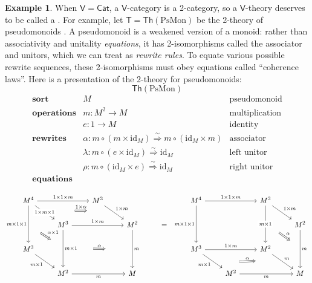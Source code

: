 \documentclass{amsart}
\newcommand{\define}[1]{{\bf \boldmath{#1}}}
\theoremstyle{definition}
\newtheorem{example}[theorem]{Example}
\newcommand{\Th}{\mathsf{Th}}
\newcommand{\Cat}{\mathsf{Cat}}
\newcommand{\V}{\mathsf{V}}
\newcommand{\T}{\mathsf{T}}
\newcommand{\maps}{\colon}
\newcommand{\id}{\mathrm{id}}
\begin{document}
\begin{example}
\label{ex:1}
When $\V = \Cat$, a $\V$-category is a 2-category, so a $\V$-theory deserves to be called a \define{2-theory}.  For example, let $\T = \Th(\mathrm{PsMon})$ be the 2-theory of pseudomonoids \cite{pseudo}.   A pseudomonoid is a weakened version of a monoid: rather than associativity and unitality \textit{equations}, it has 2-isomorphisms called the associator and unitors, which we can treat as \textit{rewrite rules}.  To equate various possible rewrite sequences, these 2-isomorphisms must obey equations called ``coherence laws''.  Here is a presentation of the 2-theory for pseudomonoids:
\newpage
	\[ \Th(\mathrm{PsMon}) \]
	\[\begin{array}{lll}
	\textbf{sort} & M & \text{pseudomonoid}\\
	 \textbf{operations}
	& m\maps M^2 \to M & \text{multiplication}\\
	 & e\maps1 \to M & \text{identity}\\
	\textbf{rewrites} & \alpha \colon m \circ (m \times \id_M) \stackrel{\sim}{\Longrightarrow} m \circ (\id_M \times m) & \text{associator}\\
	& \lambda\maps  m \circ (e \times \id_M) \stackrel{\sim}{\Longrightarrow} \id_M & \text{left unitor}\\
	& \rho\maps m \circ (\id_M \times e) \stackrel{\sim}{\Longrightarrow} \id_M & \text{right unitor}\\
	\textbf{equations}
          \end{array}\]

        \[\begin{tikzcd}
          M^4 \ar[rr,"1\times 1\times m"] \ar[dr,"1\times m\times 1" description, ""name=a1] \ar[dd, "m\times 1\times 1",swap,""name=b1] && M^3 \ar[dr, "1\times m",""name=a2] \arrow[Rightarrow,"1\times \alpha",from=a1,to=a2,shorten >=1.3cm,shorten <=1.3cm] &&& M^4 \ar[rr, "1\times 1\times m"] \ar[dd,"m\times 1\times 1",swap,""name=d1] && M^3 \ar[dd,"m\times 1" description,""name=d2] \ar[dr,"1\times m"] %
          & \\
          & M^3 \ar[rr,"1\times m"] \ar[dd,"m\times 1",""name=b2] \arrow[Rightarrow,"\alpha\times 1",from=b1,to=b2,shorten >=0.7cm,shorten <=0.7cm] && M^2 \ar[dd,"m",""name=c1] & = & &&& M^2 \ar[dd,"m",""name=f1] \arrow[Rightarrow,"\alpha",from=d2,to=f1,shorten >=0.6cm,shorten <=0.6cm] \arrow[Rightarrow,"\alpha",from=b2,to=c1,shorten >=1.3cm,shorten <=1.3cm] \\
          M^3 \ar[dr,"m\times 1",swap] &&& && M^3 \ar[rr,"1\times m"] \ar[dr,"m\times 1",swap,,""name=e1] && M^2 \ar[dr,"m",,""name=e2] \arrow[Rightarrow,"\alpha",from=e1,to=e2,shorten >=1.3cm,shorten <=1.3cm] & \\
          & M^2 \ar[rr,"m",swap] && M && & M^2 \ar[rr,"m",swap] && M
        \end{tikzcd}\]


\end{example}
\end{document}
